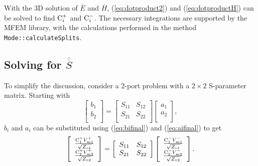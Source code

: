 \documentclass[titlepage]{article}
\renewcommand\_{\textunderscore\linebreak[1]}
\begin{document}
With the 3D solution of $\overline{E}$ and $\overline{H}$, (\ref{eq:dotproduct2}) and (\ref{eq:dotproductH}) can be solved to find $\textnormal{C}_{i}^{+}$ and $\textnormal{C}_{i}^{-}$.  The necessary integrations are supported by the MFEM library, with the calculations performed in the method \texttt{Mode::calculateSplits}.

\subsection{Solving for $\overline{\overline{S}}$}
\label{sec:solvingS}

To simplify the discussion, consider a 2-port problem with a $2\times 2$ S-parameter matrix.  Starting with
\begin{equation}
\label{eq:2by2}
\left[ \begin{array}{c}
  b_1 \\
  b_2 \\
\end{array} \right] =
\left[ \begin{array}{cc}
  S_{11} & S_{12} \\
  S_{21} & S_{22} \\
\end{array} \right]
\left[ \begin{array}{c}
  a_1 \\
  a_2 \\
\end{array} \right],
\end{equation}
$b_i$ and $a_i$ can be substituted using (\ref{eq:bifinal}) and (\ref{eq:aifinal}) to get
\begin{equation}
\label{eq:2by2sub}
\left[ \begin{array}{c}
  \frac{\textnormal{C}_{1}^{+}V_{m1}^{+}}{\sqrt{Z_{\circ 1}}} \\
  \frac{\textnormal{C}_{2}^{+}V_{m2}^{+}}{\sqrt{Z_{\circ 2}}} \\
\end{array} \right] =
\left[ \begin{array}{cc}
  S_{11} & S_{12} \\
  S_{21} & S_{22} \\
\end{array} \right]
\left[ \begin{array}{c}
  \frac{\textnormal{C}_{1}^{-}V_{m1}^{-}}{\sqrt{Z_{\circ 1}}} \\
  \frac{\textnormal{C}_{2}^{-}V_{m2}^{-}}{\sqrt{Z_{\circ 2}}} \\
\end{array} \right].
\end{equation}
\end{document}
